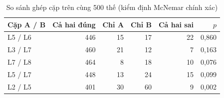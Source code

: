 \begin{table}[H]
  \centering
  \small
  \caption{So sánh ghép cặp trên cùng 500 thế (kiểm định McNemar chính xác)}
  \label{tab:cs-ct-mcnemar}
  \begin{tabular}{lrrrrr}
    \toprule
    Cặp A / B & Cả hai đúng & Chỉ A & Chỉ B & Cả hai sai & $p$ \\
    \midrule
    L5 / L6 & 446 & 15 & 17 & 22 & 0,860 \\
    L3 / L7 & 460 & 21 & 12 & 7 & 0,163 \\
    L7 / L8 & 464 & 8 & 18 & 10 & 0,076 \\
    L5 / L7 & 448 & 13 & 24 & 15 & 0,099 \\
    L2 / L5 & 401 & 30 & 60 & 9 & 0,002 \\
    \bottomrule
  \end{tabular}
\end{table}

